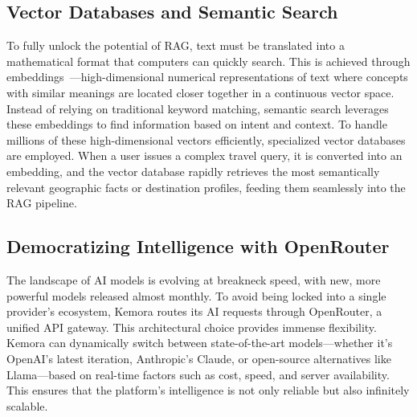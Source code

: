 \subsection{Vector Databases and Semantic Search}
To fully unlock the potential of RAG, text must be translated into a mathematical format that computers can quickly search. This is achieved through embeddings~\cite{mikolov2013word2vec}—high-dimensional numerical representations of text where concepts with similar meanings are located closer together in a continuous vector space. Instead of relying on traditional keyword matching, semantic search leverages these embeddings to find information based on intent and context. To handle millions of these high-dimensional vectors efficiently, specialized vector databases are employed. When a user issues a complex travel query, it is converted into an embedding, and the vector database rapidly retrieves the most semantically relevant geographic facts or destination profiles, feeding them seamlessly into the RAG pipeline.

\subsection{Democratizing Intelligence with OpenRouter}
The landscape of AI models is evolving at breakneck speed, with new, more powerful models released almost monthly. To avoid being locked into a single provider's ecosystem, Kemora routes its AI requests through OpenRouter, a unified API gateway. This architectural choice provides immense flexibility. Kemora can dynamically switch between state-of-the-art models—whether it's OpenAI's latest iteration, Anthropic's Claude, or open-source alternatives like Llama—based on real-time factors such as cost, speed, and server availability. This ensures that the platform's intelligence is not only reliable but also infinitely scalable.

